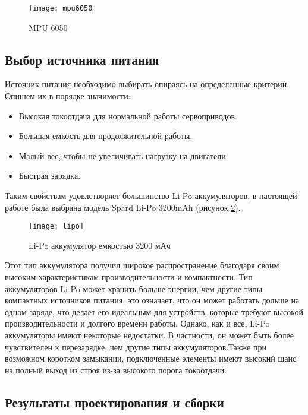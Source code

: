 \begin{figure}[h!]
	\begin{center}
		\texttt{[image: mpu6050]}
		\caption{MPU 6050}
		\label{mpu6050}
	\end{center}
\end{figure}

\subsection{Выбор источника питания}\label{C4_4_4}
Источник питания необходимо выбирать опираясь на определенные критерии. Опишем их в порядке значимости:
\begin{itemize}
	\item Высокая токоотдача для нормальной работы сервоприводов.
	\item Большая емкость для продолжительной работы.
	\item Малый вес, чтобы не увеличивать нагрузку на двигатели.
	\item Быстрая зарядка.
\end{itemize}

Таким свойствам удовлетворяет большинство Li-Po аккумуляторов, в настоящей работе была выбрана модель Spard Li-Po 3200mAh (рисунок \ref{lipo}).
\begin{figure}[h!]
	\begin{center}
		\texttt{[image: lipo]}
		\caption{Li-Po аккумулятор емкостью 3200 мАч}
		\label{lipo}
	\end{center}
\end{figure}
Этот тип аккумулятора получил широкое распространение благодаря своим высоким характеристикам производительности и компактности. Тип аккумуляторов Li-Po может хранить больше энергии, чем другие типы компактных источников питания, это означает, что он может работать дольше на одном заряде, что делает его идеальным для устройств, которые требуют высокой производительности и долгого времени работы. Однако, как и все, Li-Po аккумуляторы имеют некоторые недостатки. В частности, он может быть более чувствителен к перезарядке, чем другие типы аккумуляторов.Также при возможном коротком замыкании, подключенные элементы имеют высокий шанс на полный выход из строя из-за высокого порога токоотдачи. 

\subsection{Результаты проектирования и сборки}\label{C4_4_5}

